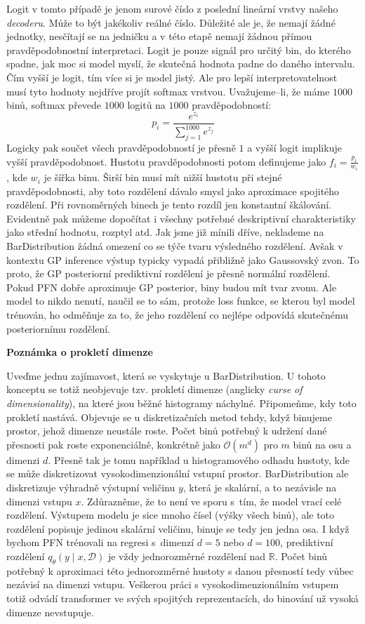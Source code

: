 Logit v tomto případě je jenom surové číslo z poslední lineární vrstvy našeho \emph{decoderu}.
Může to být jakékoliv reálné číslo.
Důležité ale je, že nemají žádné jednotky, nesčítají se na jedničku a v této etapě nemají žádnou přímou pravděpodobnostní interpretaci.
Logit je pouze signál pro určitý bin, do kterého spadne, jak moc si model myslí, že skutečná hodnota padne do daného intervalu.
Čím vyšší je logit, tím více si je model jistý.
Ale pro lepší interpretovatelnost musí tyto hodnoty nejdříve projít softmax vrstvou.
Uvažujeme–li, že máme $1000$ binů, softmax převede $1000$ logitů na $1000$ pravděpodobností:
$$p_i = \frac{e^{z_i}}{\sum_{j=1}^{1000} e^{z_j}}$$
Logicky pak součet všech pravděpodobností je přesně $1$ a vyšší logit implikuje vyšší pravděpodobnost.
Hustotu pravděpodobnosti potom definujeme jako $f_i = \frac{p_i}{w_i}$, kde $w_i$ je šířka binu.
Širší bin musí mít nižší hustotu při stejné pravděpodobnosti, aby toto rozdělení dávalo smysl jako aproximace spojitého rozdělení. 
Při rovnoměrných binech je tento rozdíl jen konstantní škálování.
Evidentně pak můžeme dopočítat i všechny potřebné deskriptivní charakteristiky jako střední hodnotu, rozptyl atd.
Jak jsme již mínili dříve, neklademe na BarDistribution žádná omezení co se týče tvaru výsledného rozdělení.
Avšak v kontextu GP inference výstup typicky vypadá přibližně jako Gaussovský zvon. 
To proto, že GP posteriorní prediktivní rozdělení je přesně normální rozdělení.
Pokud PFN dobře aproximuje GP posterior, biny budou mít tvar zvonu. 
Ale model to nikdo nenutí, naučil se to sám, protože loss funkce, se kterou byl model trénován, ho odměňuje za to, že jeho rozdělení co nejlépe odpovídá skutečnému posteriornímu rozdělení.
\par   

\textbf{Poznámka o prokletí dimenze}

Uveďme jednu zajímavost, která se vyskytuje u BarDistribution.
U tohoto konceptu se totiž neobjevuje tzv. prokletí dimenze (anglicky \emph{curse of dimensionality}), na které jsou běžné histogramy náchylné.
Připomeňme, kdy toto prokletí nastává.
Objevuje se u diskretizačních metod tehdy, když binujeme prostor, jehož dimenze neustále roste.
Počet binů potřebný k udržení dané přesnosti pak roste exponenciálně, konkrétně jako $\mathcal{O}(m^d)$ pro $m$ binů na osu a dimenzi $d$.
Přesně tak je tomu například u histogramového odhadu hustoty, kde se může diskretizovat vysokodimenzionální vstupní prostor.
BarDistribution ale diskretizuje výhradně výstupní veličinu $y$, která je skalární, a to nezávisle na dimenzi vstupu $x$.
Zdůrazněme, že to není ve sporu s~tím, že model vrací celé rozdělení.
Výstupem modelu je sice mnoho čísel (výšky všech binů), ale toto rozdělení popisuje jedinou skalární veličinu, binuje se tedy jen jedna osa.
I když bychom PFN trénovali na regresi s~dimenzí $d = 5$ nebo $d = 100$, prediktivní rozdělení $q_\theta(y \mid x, \mathcal{D})$ je vždy jednorozměrné rozdělení nad $\mathbb{R}$.
Počet binů potřebný k aproximaci této jednorozměrné hustoty s danou přesností tedy vůbec nezávisí na dimenzi vstupu.
Veškerou práci s vysokodimenzionálním vstupem totiž odvádí transformer ve svých spojitých reprezentacích, do binování už vysoká dimenze nevstupuje.
\par

